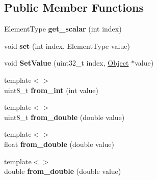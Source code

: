 \subsection*{Public Member Functions}
\begin{DoxyCompactItemize}
\item 
Element\+Type {\bfseries get\+\_\+scalar} (int index)\hypertarget{classv8_1_1internal_1_1_fixed_typed_array_a9b645785a671dab9ef26f1b7332ce643}{}\label{classv8_1_1internal_1_1_fixed_typed_array_a9b645785a671dab9ef26f1b7332ce643}

\item 
void {\bfseries set} (int index, Element\+Type value)\hypertarget{classv8_1_1internal_1_1_fixed_typed_array_a42f81163d59b755e257227b3f8bcf22e}{}\label{classv8_1_1internal_1_1_fixed_typed_array_a42f81163d59b755e257227b3f8bcf22e}

\item 
void {\bfseries Set\+Value} (uint32\+\_\+t index, \hyperlink{classv8_1_1internal_1_1_object}{Object} $\ast$value)\hypertarget{classv8_1_1internal_1_1_fixed_typed_array_ad125459e798b27470c36a32de783edb1}{}\label{classv8_1_1internal_1_1_fixed_typed_array_ad125459e798b27470c36a32de783edb1}

\item 
{\footnotesize template$<$$>$ }\\uint8\+\_\+t {\bfseries from\+\_\+int} (int value)\hypertarget{classv8_1_1internal_1_1_fixed_typed_array_a4a1669ff59ffbffee79c146093105157}{}\label{classv8_1_1internal_1_1_fixed_typed_array_a4a1669ff59ffbffee79c146093105157}

\item 
{\footnotesize template$<$$>$ }\\uint8\+\_\+t {\bfseries from\+\_\+double} (double value)\hypertarget{classv8_1_1internal_1_1_fixed_typed_array_a35a7dfad90f049ea4801bd747a528d7c}{}\label{classv8_1_1internal_1_1_fixed_typed_array_a35a7dfad90f049ea4801bd747a528d7c}

\item 
{\footnotesize template$<$$>$ }\\float {\bfseries from\+\_\+double} (double value)\hypertarget{classv8_1_1internal_1_1_fixed_typed_array_a2cc4907615b08f33d6db162e07a33805}{}\label{classv8_1_1internal_1_1_fixed_typed_array_a2cc4907615b08f33d6db162e07a33805}

\item 
{\footnotesize template$<$$>$ }\\double {\bfseries from\+\_\+double} (double value)\hypertarget{classv8_1_1internal_1_1_fixed_typed_array_ad03739b3007907ead1f4ca3670ae271f}{}\label{classv8_1_1internal_1_1_fixed_typed_array_ad03739b3007907ead1f4ca3670ae271f}

\end{DoxyCompactItemize}
